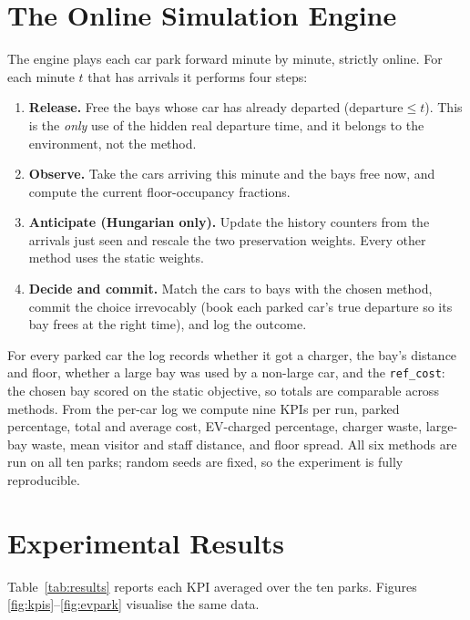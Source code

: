 \documentclass[11pt,a4paper]{article}
\newcommand{\code}[1]{\texttt{\small #1}}
\begin{document}
\section{The Online Simulation Engine}

The engine plays each car park forward minute by minute, strictly online. For each minute
$t$ that has arrivals it performs four steps:

\begin{enumerate}[leftmargin=1.6em]
  \item \textbf{Release.} Free the bays whose car has already departed
        ($\text{departure}\le t$). This is the \emph{only} use of the hidden real
        departure time, and it belongs to the environment, not the method.
  \item \textbf{Observe.} Take the cars arriving this minute and the bays free now, and
        compute the current floor-occupancy fractions.
  \item \textbf{Anticipate (Hungarian only).} Update the history counters from the
        arrivals just seen and rescale the two preservation weights. Every other method
        uses the static weights.
  \item \textbf{Decide and commit.} Match the cars to bays with the chosen method, commit
        the choice irrevocably (book each parked car's true departure so its bay frees at
        the right time), and log the outcome.
\end{enumerate}

For every parked car the log records whether it got a charger, the bay's distance and
floor, whether a large bay was used by a non-large car, and the \code{ref\_cost}: the
chosen bay scored on the static objective, so totals are comparable across methods. From
the per-car log we compute nine KPIs per run, parked percentage, total and average
cost, EV-charged percentage, charger waste, large-bay waste, mean visitor and staff
distance, and floor spread. All six methods are run on all ten parks; random seeds are
fixed, so the experiment is fully reproducible.

\section{Experimental Results}

Table~\ref{tab:results} reports each KPI averaged over the ten parks. Figures
\ref{fig:kpis}--\ref{fig:evpark} visualise the same data.
\end{document}
